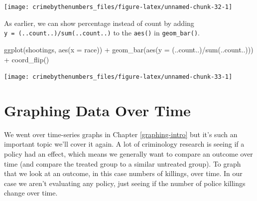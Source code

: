 \documentclass[
  12pt,
]{book}
\newenvironment{Shaded}{\begin{snugshade}}{\end{snugshade}}
\newcommand{\AttributeTok}[1]{\textcolor[rgb]{0.61,0.61,0.61}{#1}}
\newcommand{\ConstantTok}[1]{\textcolor[rgb]{0,0,0}{#1}}
\newcommand{\FunctionTok}[1]{\textcolor[rgb]{0,0,0}{#1}}
\newcommand{\NormalTok}[1]{#1}
\newcommand{\OtherTok}[1]{\textcolor[rgb]{0.37,0.37,0.37}{#1}}
\newcommand{\SpecialCharTok}[1]{\textcolor[rgb]{0,0,0}{#1}}
\begin{document}
\begin{Shaded}
\end{Shaded}

\begin{center}\texttt{[image: crimebythenumbers\_files/figure-latex/unnamed-chunk-32-1]} \end{center}

As earlier, we can show percentage instead of count by adding \texttt{y\ =\ (..count..)/sum(..count..)} to the \texttt{aes()} in \texttt{geom\_bar()}.

\begin{Shaded}
\begin{Highlighting}[]
\FunctionTok{ggplot}\NormalTok{(shootings, }\FunctionTok{aes}\NormalTok{(}\AttributeTok{x =}\NormalTok{ race)) }\SpecialCharTok{+} 
  \FunctionTok{geom\_bar}\NormalTok{(}\FunctionTok{aes}\NormalTok{(}\AttributeTok{y =}\NormalTok{ (..count..)}\SpecialCharTok{/}\FunctionTok{sum}\NormalTok{(..count..))) }\SpecialCharTok{+}
  \FunctionTok{coord\_flip}\NormalTok{() }
\end{Highlighting}
\end{Shaded}

\begin{center}\texttt{[image: crimebythenumbers\_files/figure-latex/unnamed-chunk-33-1]} \end{center}

\hypertarget{graphing-data-over-time}{%
\section{Graphing Data Over Time}\label{graphing-data-over-time}}

We went over time-series graphs in Chapter \ref{graphing-intro} but it's such an important topic we'll cover it again. A lot of criminology research is seeing if a policy had an effect, which means we generally want to compare an outcome over time (and compare the treated group to a similar untreated group). To graph that we look at an outcome, in this case numbers of killings, over time. In our case we aren't evaluating any policy, just seeing if the number of police killings change over time.
\end{document}
